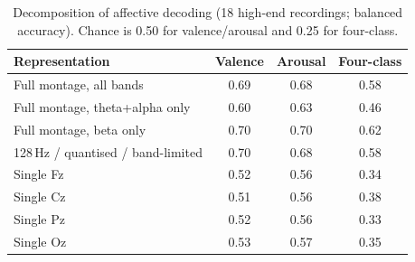 \begin{table}[H]
  \centering
  \caption{Decomposition of affective decoding (18 high-end recordings; balanced
  accuracy). Chance is 0.50 for valence/arousal and 0.25 for four-class.}
  \label{tab:decomp}
  \begin{tabular}{lccc}
    \hline
    Representation & Valence & Arousal & Four-class \\
    \hline
    Full montage, all bands & 0.69 & 0.68 & 0.58 \\
    Full montage, theta+alpha only & 0.60 & 0.63 & 0.46 \\
    Full montage, beta only & 0.70 & 0.70 & 0.62 \\
    128\,Hz / quantised / band-limited & 0.70 & 0.68 & 0.58 \\
    Single Fz & 0.52 & 0.56 & 0.34 \\
    Single Cz & 0.51 & 0.56 & 0.38 \\
    Single Pz & 0.52 & 0.56 & 0.33 \\
    Single Oz & 0.53 & 0.57 & 0.35 \\
    \hline
  \end{tabular}
\end{table}
